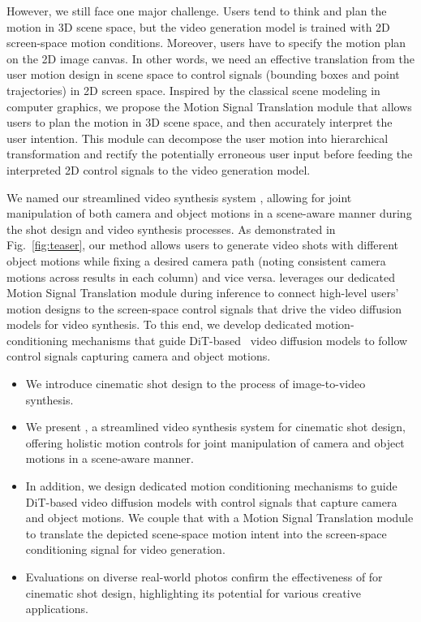 However, we still face one major challenge. 
Users tend to think and plan the motion in 3D scene space, but the video generation model is trained with 2D screen-space motion conditions. 
Moreover, users have to specify the motion plan on the 2D image canvas. In other words, we need an effective translation from the user motion design in scene space to control signals (bounding boxes and point trajectories) in 2D screen space. 
Inspired by the classical scene modeling in computer graphics, we propose the 
Motion Signal Translation module that allows users to plan the motion in 3D scene space, and then accurately interpret the user intention. 
This module can decompose the user motion into hierarchical transformation and rectify the potentially erroneous user input before feeding the interpreted 2D control signals to the video generation model.

We named 
our streamlined video synthesis system \textit{\MOCA},
allowing for joint manipulation of both camera and object motions in a scene-aware manner during the shot design and video synthesis processes.
As demonstrated in Fig.~\ref{fig:teaser}, our method allows users to generate video shots with different object motions while fixing a desired camera path (noting consistent camera motions across results in each column) and vice versa.
\MOCA leverages our dedicated Motion Signal Translation module during inference to connect high-level users' motion designs to the screen-space control signals that drive the video diffusion models for video synthesis.
To this end, we develop dedicated motion-conditioning mechanisms that guide DiT-based~\cite{peebles2023scalable} video diffusion models to follow control signals capturing camera and object motions. 


\begin{itemize} 
%
\item We introduce cinematic shot design to the process of image-to-video synthesis. 
%
\item We present \MOCA, a streamlined video synthesis system for cinematic shot design, offering holistic motion controls for joint manipulation of camera and object motions in a scene-aware manner. 
%
\item In addition, we design dedicated motion conditioning mechanisms to guide DiT-based video diffusion models with control signals that capture camera and object motions. We couple that with a Motion Signal Translation module to translate the depicted scene-space motion intent into the screen-space conditioning signal for video generation. 
%
\item Evaluations on diverse real-world photos confirm the effectiveness of \MOCA for cinematic shot design, highlighting its potential for various creative applications. 
\end{itemize}